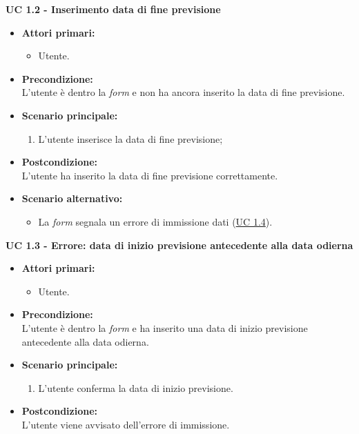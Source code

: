 \noindent \textbf{\large UC 1.2 - Inserimento data di fine previsione}
\label{uc:inserimento-data-fine-prev}
\begin{itemize}

	\item \textbf{Attori primari: }
		\begin{itemize}
			\item Utente.
		\end{itemize}

	\item \textbf{Precondizione: }\\[0.3cm]
		L'utente è dentro la \textit{form} e non ha ancora inserito la data di fine previsione.

	\item \textbf{Scenario principale: }
		\begin{enumerate}
			\item L'utente inserisce la data di fine previsione;
		\end{enumerate}

	\item \textbf{Postcondizione: }\\[0.3cm]
		L'utente ha inserito la data di fine previsione correttamente.

	\item \textbf{Scenario alternativo: }
		\begin{itemize}
		    \item La \textit{form} segnala un errore di immissione dati (\hyperref[uc:err-inserimento-data-fine-prev]{UC 1.4}).
		\end{itemize}

\end{itemize}

\vspace{0.4cm}

\noindent \textbf{\large UC 1.3 - Errore: data di inizio previsione antecedente alla data odierna}
\label{uc:err-inserimento-data-inizio-prev}
\begin{itemize}

	\item \textbf{Attori primari: }
		\begin{itemize}
			\item Utente.
		\end{itemize}

	\item \textbf{Precondizione: }\\[0.3cm]
		L'utente è dentro la \textit{form} e ha inserito una data di inizio previsione antecedente
		alla data odierna.

	\item \textbf{Scenario principale: }
		\begin{enumerate}
			\item L'utente conferma la data di inizio previsione.
		\end{enumerate}
		

	\item \textbf{Postcondizione: }\\[0.3cm]
		L'utente viene avvisato dell'errore di immissione.

\end{itemize}

